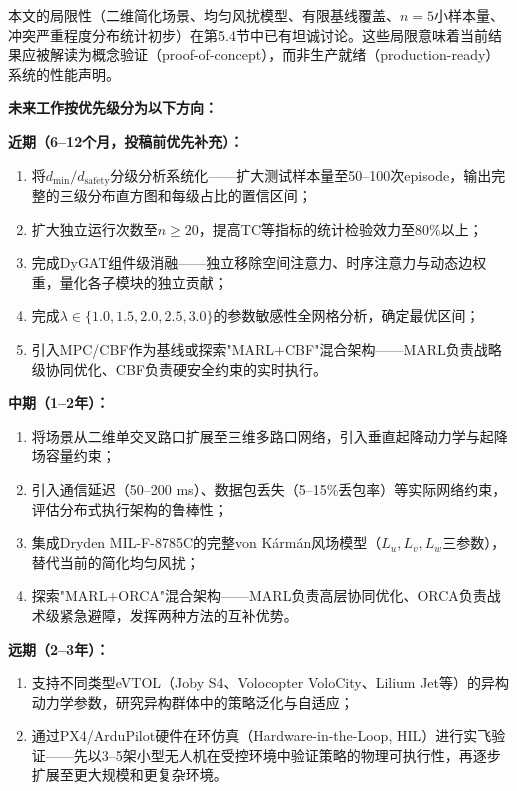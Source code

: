 \documentclass[12pt,a4paper,UTF8]{ctexart}
\begin{document}
本文的局限性（二维简化场景、均匀风扰模型、有限基线覆盖、$n=5$小样本量、冲突严重程度分布统计初步）在第5.4节中已有坦诚讨论。这些局限意味着当前结果应被解读为概念验证（proof-of-concept），而非生产就绪（production-ready）系统的性能声明。

\textbf{未来工作按优先级分为以下方向：}

\textbf{近期（6--12个月，投稿前优先补充）：}
\begin{enumerate}[label=(\arabic*)]
    \item 将$d_{\min}/d_{\text{safety}}$分级分析系统化——扩大测试样本量至50--100次episode，输出完整的三级分布直方图和每级占比的置信区间；
    \item 扩大独立运行次数至$n \geq 20$，提高TC等指标的统计检验效力至80\%以上；
    \item 完成DyGAT组件级消融——独立移除空间注意力、时序注意力与动态边权重，量化各子模块的独立贡献；
    \item 完成$\lambda \in \{1.0, 1.5, 2.0, 2.5, 3.0\}$的参数敏感性全网格分析，确定最优区间；
    \item 引入MPC/CBF作为基线或探索"MARL$+$CBF"混合架构——MARL负责战略级协同优化、CBF负责硬安全约束的实时执行。
\end{enumerate}

\textbf{中期（1--2年）：}
\begin{enumerate}[label=(\arabic*), resume]
    \item 将场景从二维单交叉路口扩展至三维多路口网络，引入垂直起降动力学与起降场容量约束；
    \item 引入通信延迟（50--200 ms）、数据包丢失（5--15\%丢包率）等实际网络约束，评估分布式执行架构的鲁棒性；
    \item 集成Dryden MIL-F-8785C的完整von K\'{a}rm\'{a}n风场模型（$L_u, L_v, L_w$三参数），替代当前的简化均匀风扰；
    \item 探索"MARL$+$ORCA"混合架构——MARL负责高层协同优化、ORCA负责战术级紧急避障，发挥两种方法的互补优势。
\end{enumerate}

\textbf{远期（2--3年）：}
\begin{enumerate}[label=(\arabic*), resume]
    \item 支持不同类型eVTOL（Joby S4、Volocopter VoloCity、Lilium Jet等）的异构动力学参数，研究异构群体中的策略泛化与自适应；
    \item 通过PX4/ArduPilot硬件在环仿真（Hardware-in-the-Loop, HIL）进行实飞验证——先以3--5架小型无人机在受控环境中验证策略的物理可执行性，再逐步扩展至更大规模和更复杂环境。
\end{enumerate}
\end{document}
